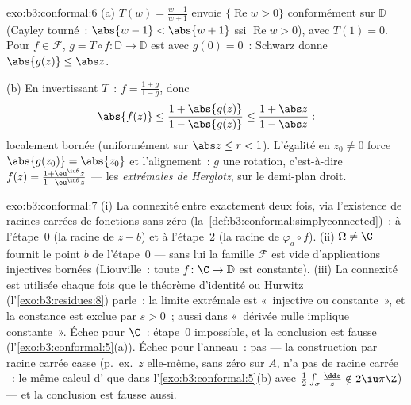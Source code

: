 \begin{solution}{exo:b3:conformal:6}
(a) $T(w) = \frac{w - 1}{w + 1}$ envoie $\{\operatorname{Re}w
> 0\}$ conformément sur $\mathbb D$ (Cayley tourné~: $\abs{w
- 1} < \abs{w + 1}$ ssi $\operatorname{Re}w > 0$), avec
$T(1) = 0$. Pour $f \in \mathcal F$, $g = T\circ f\colon
\mathbb D \to \mathbb D$ est  avec $g(0) = 0$~:
Schwarz donne $\abs{g(z)} \leq \abs z$.

(b) En invertissant $T$~: $f = \frac{1 + g}{1 - g}$, donc
\[
\abs{f(z)} \leq \frac{1 + \abs{g(z)}}{1 - \abs{g(z)}}
\leq \frac{1 + \abs z}{1 - \abs z} :
\]
localement bornée (uniformément sur $\abs z \leq r < 1$).
L'égalité en $z_0 \neq 0$ force $\abs{g(z_0)} = \abs{z_0}$
et l'alignement~: $g$ une rotation, c'est-à-dire $f(z) =
\frac{1 + \eu^{\iu\theta}z}{1 - \eu^{\iu\theta}z}$ --- les
\emph{extrémales de Herglotz},  sur le
demi-plan droit.
\end{solution}

\begin{solution}{exo:b3:conformal:7}
(i) La  connexité entre exactement deux fois, via
l'existence de racines carrées  de fonctions sans
zéro (la~\cref{def:b3:conformal:simplyconnected})~: à
l'étape~0 (la racine de $z - b$) et à l'étape~2 (la racine
de $\varphi_a\circ f$).
(ii) $\Omega \neq \C$ fournit le point $b$ de l'étape~0 ---
sans lui la famille $\mathcal F$ est vide d'applications
injectives bornées (Liouville~: toute $f \colon \C \to
\mathbb D$  est constante). (iii) La connexité est
utilisée chaque fois que le théorème d'identité ou Hurwitz
(l'\cref{exo:b3:residues:8}) parle~: la limite extrémale est
«~injective ou constante~», et la constance est exclue par
$s > 0$~; aussi dans «~dérivée nulle implique constante~».
Échec pour $\C$~: étape~0 impossible, et la conclusion est
fausse (l'\cref{exo:b3:conformal:5}(a)). Échec pour
l'anneau~: pas  --- la construction par
racine carrée casse (p.\ ex.\ $z$ elle-même, sans zéro sur
$A$, n'a pas de racine carrée ~: le même calcul
d' que dans l'\cref{exo:b3:conformal:5}(b) avec
$\frac12\int_\sigma\frac{\dd z}z \notin 2\iu\pi\Z$) --- et
la conclusion est fausse aussi.
\end{solution}

